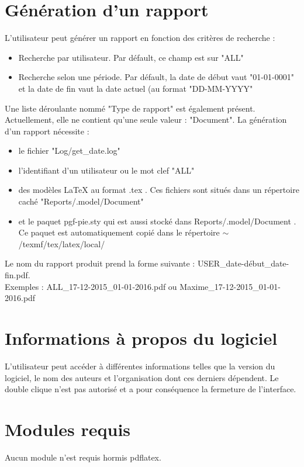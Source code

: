 \documentclass[a4paper,11pt]{article}
\begin{document}
\section{Génération d'un rapport}
	L'utilisateur peut générer un rapport en fonction des critères de recherche :
	\begin{itemize}
		\item Recherche par utilisateur. Par défault, ce champ est sur "ALL"
		\item Recherche selon une période. Par défault, la date de début vaut "01-01-0001" et la date de fin vaut la date actuel (au format "DD-MM-YYYY"
	\end{itemize}
	Une liste déroulante nommé "Type de rapport" est également présent. Actuellement, elle ne contient qu'une seule valeur : "Document".
	La génération d'un rapport nécessite :
	\begin{itemize}
		\item le fichier "Log/get\_date.log"
		\item l'identifiant d'un utilisateur ou le mot clef "ALL"
		\item des modèles LaTeX au format .tex . Ces fichiers sont situés dans un répertoire caché "Reports/.model/Document"
		\item et le paquet pgf-pie.sty qui est aussi stocké dans Reports/.model/Document . Ce paquet est automatiquement copié dans le répertoire $\sim$/texmf/tex/latex/local/
	\end{itemize}
	Le nom du rapport produit prend la forme suivante : USER\_date-début\_date-fin.pdf. \\ 
	Exemples : ALL\_17-12-2015\_01-01-2016.pdf ou Maxime\_17-12-2015\_01-01-2016.pdf

\section{Informations à propos du logiciel}
	L'utilisateur peut accéder à différentes informations telles que la version du logiciel, le nom des auteurs et l'organisation dont ces derniers dépendent. 
	Le double clique n'est pas autorisé et a pour conséquence la fermeture de l'interface.

\section{Modules requis}
	Aucun module n'est requis hormis pdflatex.
\end{document}
